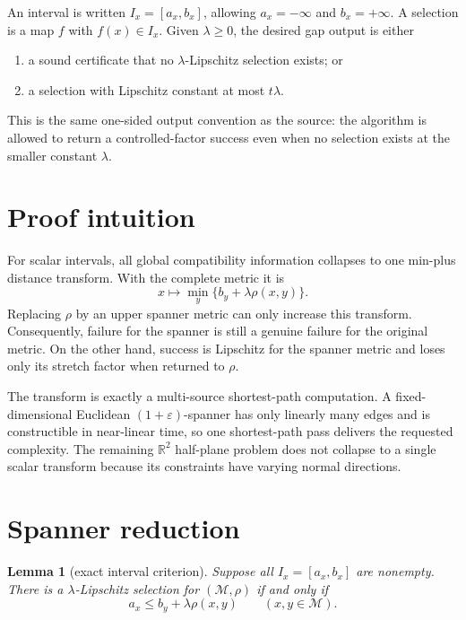 \documentclass[11pt]{article}
\newtheorem{lemma}{Lemma}
\newcommand{\R}{\mathbb R}
\newcommand{\M}{\mathcal M}
\begin{document}
An interval is written $I_x=[a_x,b_x]$, allowing
$a_x=-\infty$ and $b_x=+\infty$. A selection is a map $f$ with
$f(x)\in I_x$. Given $\lambda\ge0$, the desired gap output is either

\begin{enumerate}[label=(\roman*)]
\item a sound certificate that no $\lambda$-Lipschitz selection exists; or
\item a selection with Lipschitz constant at most $t\lambda$.
\end{enumerate}

This is the same one-sided output convention as the source: the algorithm is
allowed to return a controlled-factor success even when no selection exists
at the smaller constant $\lambda$.

\section{Proof intuition}

For scalar intervals, all global compatibility information collapses to one
min-plus distance transform. With the complete metric it is
\[
  x\longmapsto \min_y\{b_y+\lambda\rho(x,y)\}.
\]
Replacing $\rho$ by an upper spanner metric can only increase this transform.
Consequently, failure for the spanner is still a genuine failure for the
original metric. On the other hand, success is Lipschitz for the spanner
metric and loses only its stretch factor when returned to $\rho$.

The transform is exactly a multi-source shortest-path computation. A
fixed-dimensional Euclidean $(1+\varepsilon)$-spanner has only linearly many
edges and is constructible in near-linear time, so one shortest-path pass
delivers the requested complexity. The remaining $\R^2$ half-plane problem
does not collapse to a single scalar transform because its constraints have
varying normal directions.

\section{Spanner reduction}

\begin{lemma}[exact interval criterion]\label{lem:criterion}
Suppose all $I_x=[a_x,b_x]$ are nonempty. There is a
$\lambda$-Lipschitz selection for $(\M,\rho)$ if and only if
\[
 a_x\le b_y+\lambda\rho(x,y)\qquad(x,y\in\M).
\]
\end{lemma}
\end{document}
